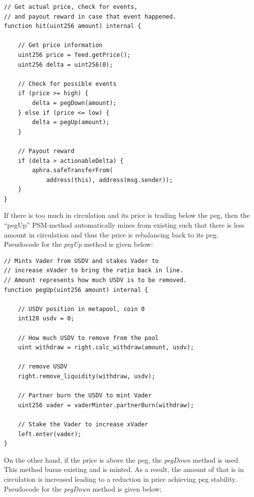 \begin{lstlisting}[language={Solidity}, caption={$hit$ defines the entry point to the PSM.}]
// Get actual price, check for events,
// and payout reward in case that event happened.
function hit(uint256 amount) internal {

    // Get price information
    uint256 price = feed.getPrice();
    uint256 delta = uint256(0);
    
    // Check for possible events
    if (price >= high) {
        delta = pegDown(amount);
    } else if (price <= low) {
        delta = pegUp(amount);
    }
    
    // Payout reward
    if (delta > actionableDelta) {
        aphra.safeTransferFrom(
            address(this), address(msg.sender));
    }
}
\end{lstlisting}

If there is too much \usdv in circulation and its price is trading below the peg, then the ``pegUp'' PSM-method automatically mines \vader from existing \usdv such that there is less amount in circulation and thus the price is rebalancing back to its peg.
Pseudocode for the \textit{pegUp} method is given below:

\begin{lstlisting}[language={Solidity}, caption={$pegUp$ gets xVader from USDV.}]
// Mints Vader from USDV and stakes Vader to 
// increase xVader to bring the ratio back in line.
// Amount represents how much USDV is to be removed.
function pegUp(uint256 amount) internal {

    // USDV position in metapool, coin 0
    int128 usdv = 0;
    
    // How much USDV to remove from the pool
    uint withdraw = right.calc_withdraw(amount, usdv);
    
    // remove USDV
    right.remove_liquidity(withdraw, usdv);
    
    // Partner burn the USDV to mint Vader
    uint256 vader = vaderMinter.partnerBurn(withdraw);
    
    // Stake the Vader to increase xVader
    left.enter(vader);
}
\end{lstlisting}

On the other hand, if the price is above the peg, the \textit{pegDown} method is used.
This method burns existing \vader and \usdv is minted.
As a result, the amount of \usdv that is in circulation is increased leading to a reduction in price achieving peg stability.
Pseudocode for the \textit{pegDown} method is given below:

